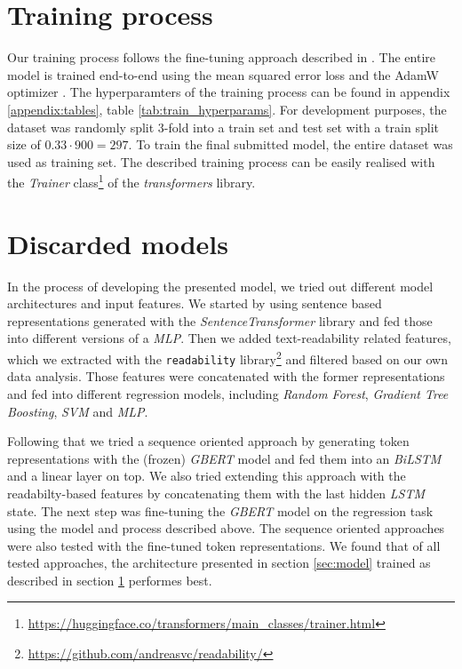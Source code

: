 \documentclass[11pt, DIV12]{scrartcl}
\begin{document}
\section{Training process}
\label{sec:train}

Our training process follows the fine-tuning approach described in \cite{DBLP:journals/corr/abs-1810-04805}. The entire model is trained end-to-end using the mean squared error loss and the AdamW optimizer \cite{DBLP:journals/corr/abs-1711-05101}. The hyperparamters of the training process can be found in appendix \ref{appendix:tables}, table \ref{tab:train_hyperparams}. For development purposes, the dataset was randomly split 3-fold into a train set and test set with a train split size of \(0.33 \cdot 900 = 297\). To train the final submitted model, the entire dataset was used as training set. The described training process can be easily realised with the \textit{Trainer} class\footnote{\url{https://huggingface.co/transformers/main_classes/trainer.html}} of the \textit{transformers} library.


\section{Discarded models}
In the process of developing the presented model, we tried out different model architectures and input features. We started by using sentence based representations generated with the \textit{SentenceTransformer} \cite{reimers-2019-sentence-bert} library and fed those into different versions of a \textit{MLP}. Then we added text-readability related features, which we extracted with the \texttt{readability} library\footnote{\url{https://github.com/andreasvc/readability/}} and filtered based on our own data analysis. Those features were concatenated with the former representations and fed into different regression models, including \textit{Random Forest}, \textit{Gradient Tree Boosting}, \textit{SVM} and \textit{MLP}.

Following that we tried a sequence oriented approach by generating token representations with the (frozen) \textit{GBERT} model and fed them into an \textit{BiLSTM} and a linear layer on top. We also tried extending this approach with the readabilty-based features by concatenating them with the last hidden \textit{LSTM} state. The next step was fine-tuning the \textit{GBERT} model on the regression task using the model and process described above. The sequence oriented approaches were also tested with the fine-tuned token representations. We found that of all tested approaches, the architecture presented in section \ref{sec:model} trained as described in section \ref{sec:train} performes best.
\end{document}
